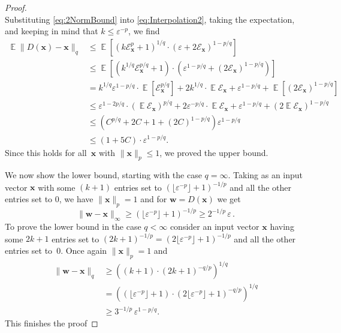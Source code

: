 \documentclass[12pt]{article}
\theoremstyle{plain}
\theoremstyle{definition}
\newcommand{\expect}{\operatorname{\mathbb{E}}}
\newcommand{\eps}{\varepsilon}
\renewcommand{\vec}{\boldsymbol}
\begin{document}
\begin{proof}
\begin{equation}
    \end{equation}
    Substituting \eqref{eq:2NormBound} into \eqref{eq:Interpolation2},
    taking the expectation, and keeping in mind that $k \leq \eps^{-p}$,
    we find
    \begin{align*}
        \expect \| D(\vec{x}) - \vec{x}\|_q
            & \leq \expect \left[ (k \mathcal{E}_{\vec{x}}^p + 1)^{1/q}
                                \cdot (\eps+2\mathcal{E}_{\vec{x}})^{1 - p/q}
                            \right] \\
            & \leq \expect \left[ (k^{1/q}\mathcal{E}_{\vec{x}}^{p/q} + 1)
                    \cdot (\eps^{1-p/q} + (2\mathcal{E}_{\vec{x}})^{1 - p/q})  
                    \right] \\
            & = k^{1/q} \eps^{1-p/q} \cdot\expect [\mathcal{E}_{\vec{x}}^{p/q}]
                + 2 k^{1/q} \cdot\expect \mathcal{E}_{\vec{x}}
                + \eps^{1-p/q}
                + \expect [(2\mathcal{E}_{\vec{x}})^{1 - p/q}] \\
            &\leq \eps^{1-2p/q} \cdot \left(\expect \mathcal{E}_{\vec{x}}\right)^{p/q}
                + 2\eps^{-p/q} \cdot \expect{\mathcal{E}_{\vec{x}}}
                + \eps^{1-p/q}
                + \left(2 \expect \mathcal{E}_{\vec{x}}\right)^{1-p/q} \\
            &\leq \left(C^{p/q} + 2C + 1 + (2C)^{1-p/q} \right) \eps^{1-p/q} \\
            &\leq (1+5C) \cdot \eps^{1-p/q} .
    \end{align*}
    Since this holds for all~$\vec{x}$ with $\|\vec{x}\|_p \leq 1$,
    we proved the upper bound.

    We now show the lower bound, starting
    with the case $q = \infty$.
    Taking as an input vector $\vec{x}$ with some $(k+1)$ 
    entries set to
    $(\lfloor  \eps ^{- p}\rfloor + 1)^{- 1/p}$
    and all the other
    entries set to $0$,
    we have $\| \vec{x} \|_p = 1$ and for $\vec{w} = D(\vec{x})$ we get
    \begin{equation*}
       \| \vec{w} - \vec{x} \|_{\infty} 
            \geq (\lfloor  \eps ^{- p}\rfloor + 1)^{- 1/p}
            \geq 2^{-1/p}\, \eps \,.
    \end{equation*}
    To prove the lower bound in the case $q < \infty$ consider an input vector $\vec{x}$ having some $2k+1$ entries set to
    $(2k+1)^{-1/p} = (2\lfloor \eps^{-p} \rfloor + 1)^{-1/p}$
    and all the other entries set to~$0$.
    Once again $\| \vec{x} \|_p = 1$ and
    \begin{align*}
        \| \vec{w} - \vec{x} \|_q
            &\geq \left((k+1) \cdot  (2k+1)^{- q/p}\right)^{1/q} \\
            &= \left((\lfloor\eps^{-p}\rfloor + 1)
                            \cdot (2\lfloor \eps^{-p} \rfloor + 1)^{-q/p}
                \right)^{1/q} \\
            &\geq 
                3^{-1/p}\,\eps^{1 - p/q} .
    \end{align*}
    This finishes the proof
\end{proof}
\end{document}
